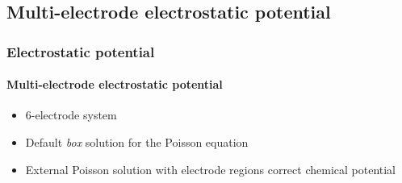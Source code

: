 \subsection{Multi-electrode electrostatic potential}

\begin{frame}
  \frametitle{Electrostatic potential}
  \framesubtitle{Multi-electrode electrostatic potential}

  \begin{itemize}
    \item 6-electrode system
    \item Default \emph{box} solution for the Poisson equation
    \item External Poisson solution with electrode regions correct chemical potential
  \end{itemize}

  \begin{center}
  \end{center}
  
\end{frame}


